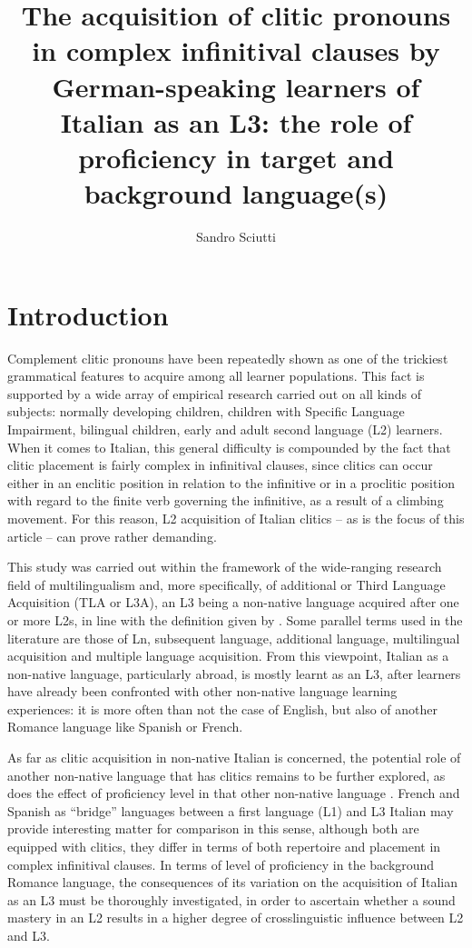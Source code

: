 \documentclass[output=paper,modfonts,nonflat,newtxmath]{langsci/langscibook}
\author{Sandro Sciutti\affiliation{{University} {of} Genoa}}
\title{{The} {acquisition} {of} {clitic} {pronouns} {in} {complex} {infinitival} {clauses} {by} {German-speaking} {learners} {of} {Italian} {as} {an} {L3:} {the} {role} {of} {proficiency} {in} {target} {and} {background} {language(s)}}
\begin{document}
\maketitle
{}

\section{Introduction}%
\label{sec:sciutti:1}

Complement clitic pronouns have been repeatedly shown as one of the trickiest grammatical features to acquire among all learner populations. This fact is supported by a wide array of empirical research carried out on all kinds of subjects: normally developing children, children with Specific Language Impairment, bilingual children, early and adult second language (L2) learners. When it comes to Italian, this general difficulty is compounded by the fact that clitic placement is fairly complex in infinitival clauses, since clitics can occur either in an enclitic position in relation to the infinitive or in a proclitic position with regard to the finite verb governing the infinitive, as a result of a climbing movement. For this reason, L2 acquisition of Italian clitics – as is the focus of this article – can prove rather demanding.

This study was carried out within the framework of the wide-ranging research field of multilingualism and, more specifically, of additional or Third Language Acquisition (TLA or L3A), an L3 being a non-native language acquired after one or more L2s, in line with the definition given by \citet[97]{Hammarberg2010}. Some parallel terms used in the literature are those of Ln, subsequent language, additional language, multilingual acquisition and multiple language acquisition. From this viewpoint, Italian as a non-native language, particularly abroad, is mostly learnt as an L3, after learners have already been confronted with other non-native language learning experiences: it is more often than not the case of English, but also of another Romance language like Spanish or French.

As far as clitic acquisition in non-native Italian is concerned, the potential role of another non-native language that has clitics remains to be further explored, as does the effect of proficiency level in that other non-native language \citep[238-239]{Giannini2008}. French and Spanish as “bridge” languages between a first language (L1) and L3 Italian may provide interesting matter for comparison in this sense, although both are equipped with clitics, they differ in terms of both repertoire and placement in complex infinitival clauses. In terms of level of proficiency in the background Romance language, the consequences of its variation on the acquisition of Italian as an L3 must be thoroughly investigated, in order to ascertain whether a sound mastery in an L2 results in a higher degree of crosslinguistic influence between L2 and L3.
\end{document}
